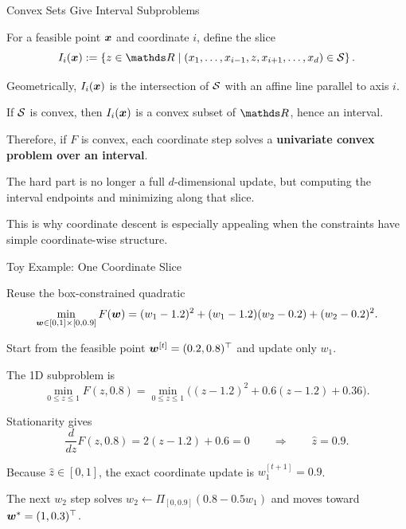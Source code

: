 \documentclass[11pt,compress,t,notes=noshow, xcolor=table]{beamer}
\begin{document}
\begin{framei}[fs=small]{Convex Sets Give Interval Subproblems}
\item For a feasible point $\xv$ and coordinate $i$, define the slice
$$
I_i(\xv) := \left\{ z \in \R \mid (x_1,\dots,x_{i-1},z,x_{i+1},\dots,x_d) \in \S \right\}.
$$
\item Geometrically, $I_i(\xv)$ is the intersection of $\S$ with an affine line parallel to axis $i$.
\item If $\S$ is convex, then $I_i(\xv)$ is a convex subset of $\R$, hence an interval.
\item Therefore, if $F$ is convex, each coordinate step solves a \textbf{univariate convex problem over an interval}.
\item The hard part is no longer a full $d$-dimensional update, but computing the interval endpoints and minimizing along that slice.
\item This is why coordinate descent is especially appealing when the constraints have simple coordinate-wise structure.
\end{framei}


\begin{framei}[fs=scriptsize]{Toy Example: One Coordinate Slice}
\item Reuse the box-constrained quadratic
\[
\min_{\wv \in [0,1] \times [0,0.9]}
F(\wv)
=
(w_1 - 1.2)^2
+
(w_1 - 1.2)(w_2 - 0.2)
+
(w_2 - 0.2)^2.
\]
\item Start from the feasible point $\wv^{[t]} = (0.2,0.8)^\top$ and update only $w_1$.
\item The 1D subproblem is
\[
\min_{0 \le z \le 1} F(z,0.8)
=
\min_{0 \le z \le 1}
\Big((z - 1.2)^2 + 0.6(z - 1.2) + 0.36\Big).
\]
\item Stationarity gives
\[
\frac{d}{dz}F(z,0.8) = 2(z - 1.2) + 0.6 = 0
\qquad \Longrightarrow \qquad
\hat z = 0.9.
\]
\item Because $\hat z \in [0,1]$, the exact coordinate update is $w_1^{[t+1]} = 0.9$.
\item The next $w_2$ step solves $w_2 \leftarrow \Pi_{[0,0.9]}(0.8 - 0.5 w_1)$ and moves toward $\wv^\ast = (1,0.3)^\top$.
\end{framei}
\end{document}
